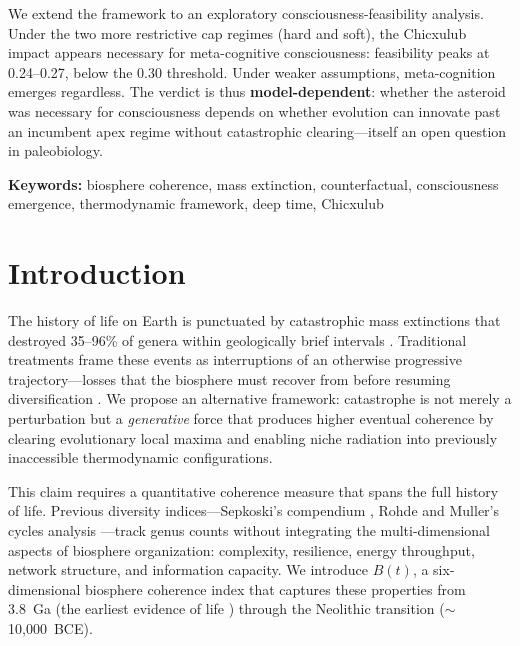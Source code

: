 \documentclass[10pt,letterpaper]{article}
\newcommand{\bt}{$B(t)$}
\begin{document}
We extend the framework to an exploratory consciousness-feasibility analysis.
Under the two more restrictive cap regimes (hard and soft), the Chicxulub
impact appears necessary for meta-cognitive consciousness: feasibility peaks
at 0.24--0.27, below the 0.30 threshold. Under weaker assumptions, meta-cognition
emerges regardless. The verdict is thus \textbf{model-dependent}: whether
the asteroid was necessary for consciousness depends on whether evolution
can innovate past an incumbent apex regime without catastrophic clearing---itself
an open question in paleobiology.

\noindent\textbf{Keywords:} biosphere coherence, mass extinction, counterfactual,
consciousness emergence, thermodynamic framework, deep time, Chicxulub

\linenumbers

\section*{Introduction}

The history of life on Earth is punctuated by catastrophic mass extinctions
that destroyed 35--96\% of genera within geologically brief intervals
\cite{sepkoski1982, bambach2006, raup1982}. Traditional treatments frame
these events as interruptions of an otherwise progressive trajectory---losses
that the biosphere must recover from before resuming diversification
\cite{erwin2001, kirchner2000}. We propose an alternative framework:
catastrophe is not merely a perturbation but a \emph{generative} force that
produces higher eventual coherence by clearing evolutionary local maxima
and enabling niche radiation into previously inaccessible thermodynamic
configurations.

This claim requires a quantitative coherence measure that spans the full
history of life. Previous diversity indices---Sepkoski's compendium
\cite{sepkoski1982}, Rohde and Muller's cycles analysis
\cite{rohde2005}---track genus counts without integrating the multi-dimensional
aspects of biosphere organization: complexity, resilience, energy throughput,
network structure, and information capacity. We introduce \bt{}, a
six-dimensional biosphere coherence index that captures these properties from
3.8~Ga (the earliest evidence of life \cite{mojzsis1996}) through the
Neolithic transition ($\sim$10,000~BCE).
\end{document}
